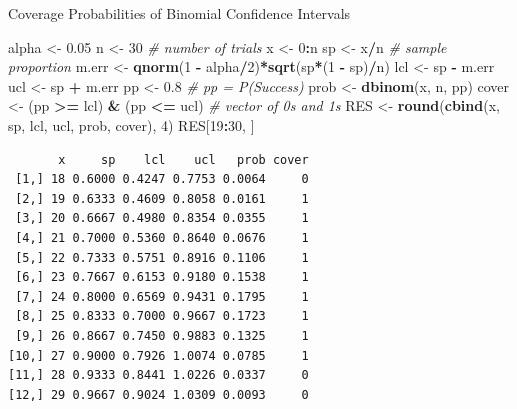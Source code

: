 \documentclass[
  ignorenonframetext,
]{beamer}
\newenvironment{Shaded}{\begin{snugshade}}{\end{snugshade}}
\newcommand{\CommentTok}[1]{\textcolor[rgb]{0.56,0.35,0.01}{\textit{#1}}}
\newcommand{\DecValTok}[1]{\textcolor[rgb]{0.00,0.00,0.81}{#1}}
\newcommand{\FloatTok}[1]{\textcolor[rgb]{0.00,0.00,0.81}{#1}}
\newcommand{\FunctionTok}[1]{\textcolor[rgb]{0.13,0.29,0.53}{\textbf{#1}}}
\newcommand{\NormalTok}[1]{#1}
\newcommand{\OtherTok}[1]{\textcolor[rgb]{0.56,0.35,0.01}{#1}}
\newcommand{\SpecialCharTok}[1]{\textcolor[rgb]{0.81,0.36,0.00}{\textbf{#1}}}
\begin{document}
\begin{frame}[fragile]{Coverage Probabilities of Binomial Confidence
Intervals}
\label{coverage-probabilities-of-binomial-confidence-intervals-3}
\tiny

\begin{Shaded}
\begin{Highlighting}[]
\NormalTok{alpha }\OtherTok{\textless{}{-}} \FloatTok{0.05}
\NormalTok{n }\OtherTok{\textless{}{-}} \DecValTok{30}   \CommentTok{\# number of trials}
\NormalTok{x }\OtherTok{\textless{}{-}} \DecValTok{0}\SpecialCharTok{:}\NormalTok{n  }
\NormalTok{sp }\OtherTok{\textless{}{-}}\NormalTok{ x}\SpecialCharTok{/}\NormalTok{n }\CommentTok{\# sample proportion}
\NormalTok{m.err }\OtherTok{\textless{}{-}} \FunctionTok{qnorm}\NormalTok{(}\DecValTok{1} \SpecialCharTok{{-}}\NormalTok{ alpha}\SpecialCharTok{/}\DecValTok{2}\NormalTok{)}\SpecialCharTok{*}\FunctionTok{sqrt}\NormalTok{(sp}\SpecialCharTok{*}\NormalTok{(}\DecValTok{1} \SpecialCharTok{{-}}\NormalTok{ sp)}\SpecialCharTok{/}\NormalTok{n)}
\NormalTok{lcl }\OtherTok{\textless{}{-}}\NormalTok{ sp }\SpecialCharTok{{-}}\NormalTok{ m.err}
\NormalTok{ucl }\OtherTok{\textless{}{-}}\NormalTok{ sp }\SpecialCharTok{+}\NormalTok{ m.err}
\NormalTok{pp }\OtherTok{\textless{}{-}} \FloatTok{0.8}   \CommentTok{\# pp = P(Success)}
\NormalTok{prob }\OtherTok{\textless{}{-}} \FunctionTok{dbinom}\NormalTok{(x, n, pp)}
\NormalTok{cover }\OtherTok{\textless{}{-}}\NormalTok{ (pp }\SpecialCharTok{\textgreater{}=}\NormalTok{ lcl) }\SpecialCharTok{\&}\NormalTok{ (pp }\SpecialCharTok{\textless{}=}\NormalTok{ ucl)  }\CommentTok{\# vector of 0s and 1s}
\NormalTok{RES }\OtherTok{\textless{}{-}} \FunctionTok{round}\NormalTok{(}\FunctionTok{cbind}\NormalTok{(x, sp, lcl, ucl, prob, cover), }\DecValTok{4}\NormalTok{)}
\NormalTok{RES[}\DecValTok{19}\SpecialCharTok{:}\DecValTok{30}\NormalTok{, ]}
\end{Highlighting}
\end{Shaded}

\begin{verbatim}
       x     sp    lcl    ucl   prob cover
 [1,] 18 0.6000 0.4247 0.7753 0.0064     0
 [2,] 19 0.6333 0.4609 0.8058 0.0161     1
 [3,] 20 0.6667 0.4980 0.8354 0.0355     1
 [4,] 21 0.7000 0.5360 0.8640 0.0676     1
 [5,] 22 0.7333 0.5751 0.8916 0.1106     1
 [6,] 23 0.7667 0.6153 0.9180 0.1538     1
 [7,] 24 0.8000 0.6569 0.9431 0.1795     1
 [8,] 25 0.8333 0.7000 0.9667 0.1723     1
 [9,] 26 0.8667 0.7450 0.9883 0.1325     1
[10,] 27 0.9000 0.7926 1.0074 0.0785     1
[11,] 28 0.9333 0.8441 1.0226 0.0337     0
[12,] 29 0.9667 0.9024 1.0309 0.0093     0
\end{verbatim}


\end{frame}
\end{document}

